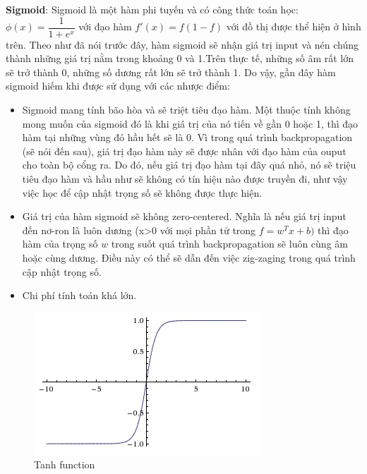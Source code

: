 \textbf{Sigmoid}: Sigmoid là một hàm phi tuyến và có công thức toán học: \textbf{$\phi(x) = \dfrac{1}{1+e^x}$} với đạo hàm $f'(x) = f(1-f)$ với đồ thị được thể hiện ở hình trên. Theo như đã nói trước đây, hàm sigmoid sẽ nhận giá trị input và nén chúng thành những giá trị nằm trong khoảng 0 và 1.Trên thực tế, những số âm rất lớn sẽ trở thành 0, những số dương rất lớn sẽ trở thành 1. Do vậy, gần đây hàm sigmoid hiếm khi được sử dụng với các nhược điểm:
\begin{itemize}
	\item Sigmoid mang tính bão hòa và sẽ triệt tiêu đạo hàm. Một thuộc tính không mong muốn của sigmoid đó là khi giá trị của nó tiến về gần 0 hoặc 1, thì đạo hàm tại những vùng đó hầu hết sẽ là 0. Vì trong quá trình backpropagation (sẽ nói đến sau), giá trị đạo hàm này sẽ được nhân với đạo hàm của ouput cho toàn bộ cổng ra. Do đó, nếu giá trị đạo hàm tại đây quá nhỏ, nó sẽ triệu tiêu đạo hàm và hầu như sẽ không có tín hiệu nào được truyền đi, như vậy việc học để cập nhật trọng số sẽ không được thực hiện.
	\item Giá trị của hàm sigmoid sẽ không zero-centered. Nghĩa là nếu giá trị input đến nơ-ron là luôn dương (x>0 với mọi phần tử trong $f = w^Tx+b)$ thì đạo hàm của trọng số $w$ trong suốt quá trình backpropagation sẽ luôn cùng âm hoặc cùng dương. Điều này có thể sẽ dẫn đến việc zig-zaging trong quá trình cập nhật trọng số.
	\item Chi phí tính toán khá lớn.
	
\end{itemize}

\begin{center}
   \begin{figure}[htp]
   \begin{center}
     \includegraphics[scale=.5]{image/tanh}
    \end{center}
    \caption{Tanh function}
    \label{fig:tanh}
    \end{figure}
\end{center}

